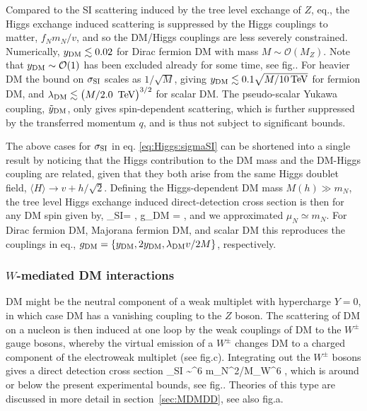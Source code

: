 Compared to the SI scattering induced by the tree level exchange of $Z$, eq.,
the Higgs exchange induced scattering is suppressed by the Higgs couplings to matter, $f_N m_N /v$, and so
 the DM/Higgs couplings are less severely constrained.
Numerically, 
$y_{\rm DM}\lesssim 0.02$ for Dirac fermion DM with mass $M\sim {\mathcal O}(M_Z)$. Note that
$y_{\rm DM}\sim {\mathcal O}(1)$ has been excluded already for some time, see fig.. 
For heavier DM the bound on $\sigma_{\rm SI}$ scales as $1/\sqrt{M}$, giving
 $y_{\rm DM}\lesssim 0.1 \sqrt{M/10\text{\,TeV}}$ for fermion DM, 
and  $\lambda_{\rm DM}\lesssim \big(M/2.0\text{\, TeV}\big)^{3/2}$ for scalar DM.
The pseudo-scalar Yukawa coupling, $\tilde y_{\rm DM}$, only gives spin-dependent scattering, which is further suppressed by the transferred momentum $q$, and is thus not subject to significant bounds.

\smallskip

The above cases for $\sigma_{\rm SI}$ in eq. \eqref{eq:Higgs:sigmaSI}
can be shortened into a single result by noticing that the Higgs contribution to the DM mass and the DM-Higgs coupling are related, given that they both arise from the same Higgs doublet field, $\langle H\rangle \to v+h/\sqrt 2$. Defining the Higgs-dependent DM mass $M(h) \gg m_N$, the tree level Higgs exchange induced direct-detection cross section is then for any DM spin given by,
\beq
\sigma_{\rm SI}= ,\qquad{}\quad
g_{\rm DM} = ,
\eeq
and we approximated $\mu_N\simeq m_N$. 
For Dirac fermion DM, Majorana fermion DM, and scalar DM this reproduces the couplings in eq., $g_{\rm DM}=\{y_{\rm DM}, 2 y_{\rm DM}, \lambda_{\rm DM} v/2M\}$, respectively. 




\subsubsection*{$W$-mediated DM interactions}
DM might be the neutral component of a weak multiplet with hypercharge $Y=0$, in which case DM has a vanishing coupling to the $Z$ boson.
The scattering of DM on a nucleon is then induced at one loop by the weak couplings of DM to the $W^\pm$ gauge bosons, whereby the virtual emission of a $W^\pm$  changes DM to a charged component of the electroweak multiplet (see fig.c).
Integrating out the $W^\pm$ bosons 
gives a direct detection cross section 
\beq
 \sigma_{\rm SI} \sim \alpha^6 m_N^2/M_W^6 ,
\eeq
which is around or below the present experimental bounds, see fig..
Theories of this type are discussed in more detail in
section~\ref{sec:MDMDD}, see also fig.a.



